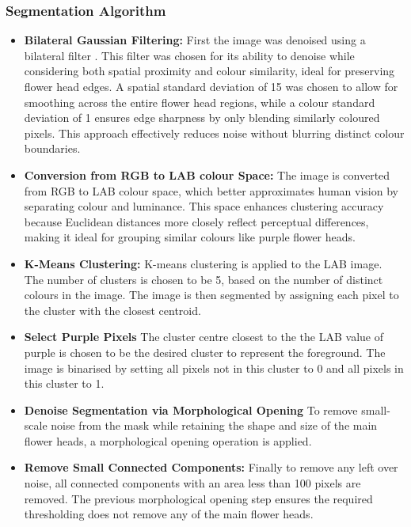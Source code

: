 \documentclass[11pt]{article}
\begin{document}
\subsubsection{Segmentation Algorithm}
\begin{itemize}
    \item \textbf{Bilateral Gaussian Filtering:} First the image was denoised using a bilateral filter \cite{710815}. This filter was chosen for its ability to denoise while considering both spatial proximity and colour similarity, ideal for preserving flower head edges. A spatial standard deviation of 15 was chosen to allow for smoothing across the entire flower head regions, while a colour standard deviation of 1 ensures edge sharpness by only blending similarly coloured pixels. This approach effectively reduces noise without blurring distinct colour boundaries.
    \item \textbf{Conversion from RGB to LAB colour Space:} The image is converted from RGB to LAB colour space, which better approximates human vision by separating colour and luminance. This space enhances clustering accuracy because Euclidean distances more closely reflect perceptual differences, making it ideal for grouping similar colours like purple flower heads.
    \item \textbf{K-Means Clustering:} K-means clustering is applied to the LAB image. The number of clusters is chosen to be 5, based on the number of distinct colours in the image. The image is then segmented by assigning each pixel to the cluster with the closest centroid.
    \item \textbf{Select Purple Pixels} The cluster centre closest to the the LAB value of purple is chosen to be the desired cluster to represent the foreground. The image is binarised by setting all pixels not in this cluster to 0 and all pixels in this cluster to 1.
    \item \textbf{Denoise Segmentation via Morphological Opening} To remove small-scale noise from the mask while retaining the shape and size of the main flower heads, a morphological opening operation is applied. 
    \item \textbf{Remove Small Connected Components:} Finally to remove any left over noise, all connected components with an area less than 100 pixels are removed. The previous morphological opening step ensures the required thresholding does not remove any of the main flower heads.
\end{itemize}
\end{document}

